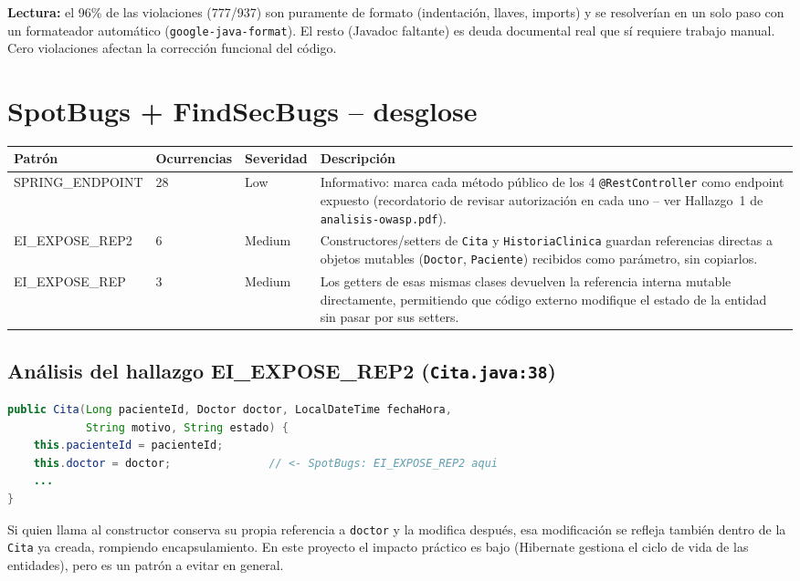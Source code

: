 \documentclass[11pt,a4paper]{article}
\begin{document}
\textbf{Lectura:} el 96\% de las violaciones (777/937) son puramente de
formato (indentaci\'on, llaves, imports) y se resolver\'ian en un solo paso
con un formateador autom\'atico (\texttt{google-java-format}). El resto
(Javadoc faltante) es deuda documental real que s\'i requiere trabajo manual.
Cero violaciones afectan la correcci\'on funcional del c\'odigo.

\section{SpotBugs + FindSecBugs -- desglose}

\begin{longtable}{@{}p{3.5cm}p{1.7cm}p{1.5cm}p{6.5cm}@{}}
\toprule
\textbf{Patr\'on} & \textbf{Ocurrencias} & \textbf{Severidad} & \textbf{Descripci\'on} \\
\midrule
\endhead
SPRING\_ENDPOINT & 28 & Low & Informativo: marca cada m\'etodo p\'ublico de
  los 4 \texttt{@RestController} como endpoint expuesto (recordatorio de
  revisar autorizaci\'on en cada uno -- ver Hallazgo~1 de
  \texttt{analisis-owasp.pdf}). \\
EI\_EXPOSE\_REP2 & 6 & Medium & Constructores/setters de \texttt{Cita} y
  \texttt{HistoriaClinica} guardan referencias directas a objetos mutables
  (\texttt{Doctor}, \texttt{Paciente}) recibidos como par\'ametro, sin
  copiarlos. \\
EI\_EXPOSE\_REP & 3 & Medium & Los getters de esas mismas clases devuelven la
  referencia interna mutable directamente, permitiendo que c\'odigo externo
  modifique el estado de la entidad sin pasar por sus setters. \\
\bottomrule
\end{longtable}

\subsection*{An\'alisis del hallazgo EI\_EXPOSE\_REP2 (\texttt{Cita.java:38})}

\begin{lstlisting}[language=java]
public Cita(Long pacienteId, Doctor doctor, LocalDateTime fechaHora,
            String motivo, String estado) {
    this.pacienteId = pacienteId;
    this.doctor = doctor;               // <- SpotBugs: EI_EXPOSE_REP2 aqui
    ...
}
\end{lstlisting}
Si quien llama al constructor conserva su propia referencia a \texttt{doctor}
y la modifica despu\'es, esa modificaci\'on se refleja tambi\'en dentro de la
\texttt{Cita} ya creada, rompiendo encapsulamiento. En este proyecto el
impacto pr\'actico es bajo (Hibernate gestiona el ciclo de vida de las
entidades), pero es un patr\'on a evitar en general.
\end{document}
